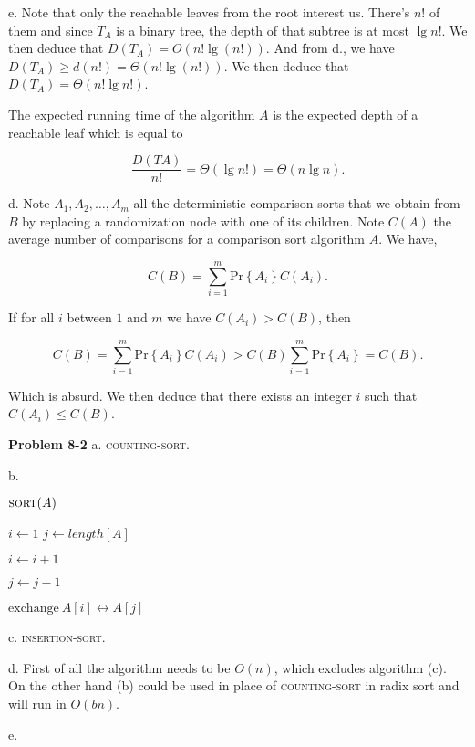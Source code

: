 \documentclass[a4paper,12pt]{article}
\newcommand{\newprob}[1]
{\bigskip \noindent \textbf{Problem #1} \newline}
\newcommand{\subpar}[1]{\medskip \noindent #1.}
\newcommand{\la}{\leftarrow}
\newcommand{\exchange}[2]{\mathrm{exchange}\ #1 \leftrightarrow #2}
\newcommand{\prob}[1]{\mathrm{Pr}\left\{ #1 \right\}}
\newenvironment{alg}[2]
               {\noindent $\textsc{#1}(#2)$ \begin{algorithmic}}
               {\end{algorithmic}}
\begin{document}
\subpar{e} Note that only the reachable leaves from the root interest
us.  There's $n!$ of them and since $T_A$ is a binary tree, the depth
of that subtree is at most $\lg n!$.  We then deduce that $D(T_A) =
O(n!  \lg(n!))$.  And from d., we have $D(T_A) \ge d(n!) = \Theta(n!
\lg (n!))$.  We then deduce that $D(T_A) = \Theta(n! \lg n!)$.

The expected running time of the algorithm $A$ is the expected depth
of a reachable leaf which is equal to

\[ \frac{D(TA)}{n!} = \Theta(\lg n!) = \Theta(n\lg n).\]

\subpar{d} Note $A_1, A_2, \ldots, A_m$ all the deterministic
comparison sorts that we obtain from $B$ by replacing a randomization
node with one of its children.  Note $C(A)$ the average number of
comparisons for a comparison sort algorithm $A$.  We have,

\[ C(B) = \sum_{i=1}^m \prob{A_i} C(A_i).\]

If for all $i$ between $1$ and $m$ we have $C(A_i) > C(B)$, then

\[ C(B) = \sum_{i=1}^m \prob{A_i} C(A_i) > C(B) \sum_{i=1}^m
\prob{A_i} = C(B).\]

Which is absurd.  We then deduce that there exists an integer $i$ such
that $C(A_i) \le C(B)$.

\newprob{8-2} \subpar{a} \textsc{counting-sort}.

\subpar{b}

\begin{alg}{sort}{A}
  \STATE $i \la 1$
  \STATE $j \la length[A]$


  \STATE $i \la i + 1$
  \ENDWHILE

  \STATE $j \la j - 1$
  \ENDWHILE

  \STATE $\exchange{A[i]}{A[j]}$
  \ENDWHILE
\end{alg}

\subpar{c} \textsc{insertion-sort}.

\subpar{d} First of all the algorithm needs to be $O(n)$, which excludes
algorithm (c).  On the other hand (b) could be used in place of
\textsc{counting-sort} in radix sort and will run in $O(bn)$.

\subpar{e}
\end{document}
